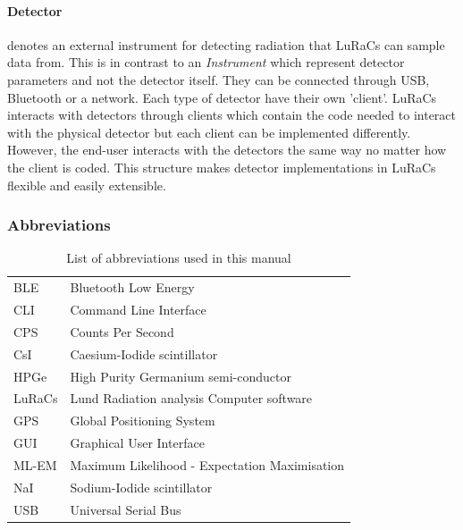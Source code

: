 \paragraph{Detector} denotes an external instrument for detecting radiation that LuRaCs can sample data from. This is in contrast to an \textit{Instrument} which represent detector parameters and not the detector itself. They can be connected through USB, Bluetooth or a network. Each type of detector have their own 'client'. LuRaCs interacts with detectors through clients which contain the code needed to interact with the physical detector but each client can be implemented differently. However, the end-user interacts with the detectors the same way no matter how the client is coded. This structure makes detector implementations in LuRaCs flexible and easily extensible.

\subsubsection{Abbreviations}
\begin{table}[H]
    \centering
    \caption{List of abbreviations used in this manual}
    \label{tab:abbreviations}
    \begin{tabular}{ll}
        BLE & Bluetooth Low Energy \\
        CLI & Command Line Interface \\
        CPS & Counts Per Second \\
        CsI & Caesium-Iodide scintillator \\
        HPGe & High Purity Germanium semi-conductor \\
        LuRaCs & Lund Radiation analysis Computer software \\
        GPS & Global Positioning System \\
        GUI & Graphical User Interface \\
        ML-EM & Maximum Likelihood - Expectation Maximisation \\
        NaI & Sodium-Iodide scintillator \\
        USB & Universal Serial Bus \\
    \end{tabular}
\end{table}
